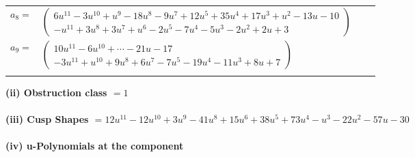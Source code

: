 \documentclass[1p]{elsarticle_modified}
\theoremstyle{definition}
\begin{document}
\begin{tabular}{m{7pt} m{180pt} m{7pt} m{180pt} }
\flushright $a_{8}=$&$\begin{pmatrix}6 u^{11}-3 u^{10}+u^9-18 u^8-9 u^7+12 u^5+35 u^4+17 u^3+u^2-13 u-10\\- u^{11}+3 u^8+3 u^7+u^6-2 u^5-7 u^4-5 u^3-2 u^2+2 u+3\end{pmatrix}$ \\
\flushright $a_{9}=$&$\begin{pmatrix}10 u^{11}-6 u^{10}+\cdots-21 u-17\\-3 u^{11}+u^{10}+9 u^8+6 u^7-7 u^5-19 u^4-11 u^3+8 u+7\end{pmatrix}$\\&\end{tabular}
\flushleft \textbf{(ii) Obstruction class $= 1$}\\~\\
\flushleft \textbf{(iii) Cusp Shapes $= 12 u^{11}-12 u^{10}+3 u^9-41 u^8+15 u^6+38 u^5+73 u^4- u^3-22 u^2-57 u-30$}\\~\\
\newpage\renewcommand{\arraystretch}{1}
\flushleft \textbf{(iv) u-Polynomials at the component}\newline \\
\end{document}
